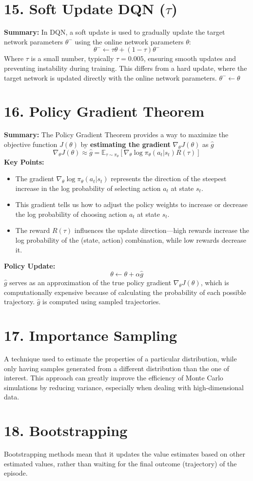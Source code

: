 \documentclass[a4paper,10pt]{article}
\begin{document}
\begin{multicols}{2}
\section*{15. Soft Update DQN (\(\tau\))}
\textbf{Summary:} In DQN, a soft update is used to gradually update the target network parameters \( \theta^- \) using the online network parameters \( \theta \):
\[
\theta^- \leftarrow \tau \theta + (1 - \tau) \theta^-
\]
Where \( \tau \) is a small number, typically \( \tau = 0.005 \), ensuring smooth updates and preventing instability during training. This differs from a hard update, where the target network is updated directly with the online network parameters. \( \theta^- \leftarrow \theta \)

\section*{16. Policy Gradient Theorem}
\textbf{Summary:} The Policy Gradient Theorem provides a way to maximize the objective function \( J(\theta) \) by \textbf{estimating the gradient} \( \nabla_\theta J(\theta) \) as \( \hat{g} \)
\[
\nabla_\theta J(\theta) \approx \hat{g} = \mathbb{E}_{\tau \sim \pi_\theta} \left[ \nabla_\theta \log \pi_\theta(a_t | s_t) R(\tau) \right]
\]
\textbf{Key Points:}
\begin{itemize}
    \item The gradient \( \nabla_\theta \log \pi_\theta(a_t | s_t) \) represents the direction of the steepest increase in the log probability of selecting action \( a_t \) at state \( s_t \).
    \item This gradient tells us how to adjust the policy weights to increase or decrease the log probability of choosing action \( a_t \) at state \( s_t \).
    \item The reward \( R(\tau) \) influences the update direction—high rewards increase the log probability of the (state, action) combination, while low rewards decrease it.
\end{itemize}
\textbf{Policy Update:}
\[
\theta \leftarrow \theta + \alpha \hat{g}
\]
\( \hat{g} \) serves as an approximation of the true policy gradient \( \nabla_\theta J(\theta) \), which is computationally expensive because of calculating the probability of each possible trajectory. \( \hat{g} \) is computed using sampled trajectories.

\section*{17. Importance Sampling}
A technique used to estimate the properties of a particular distribution, while only having samples generated from a different distribution than the one of interest. This approach can greatly improve the efficiency of Monte Carlo simulations by reducing variance, especially when dealing with high-dimensional data.

\section*{18. Bootstrapping}
Bootstrapping methods mean that it updates the value estimates based on other estimated values, rather than waiting for the final outcome (trajectory) of the episode.

\end{multicols}
\end{document}
